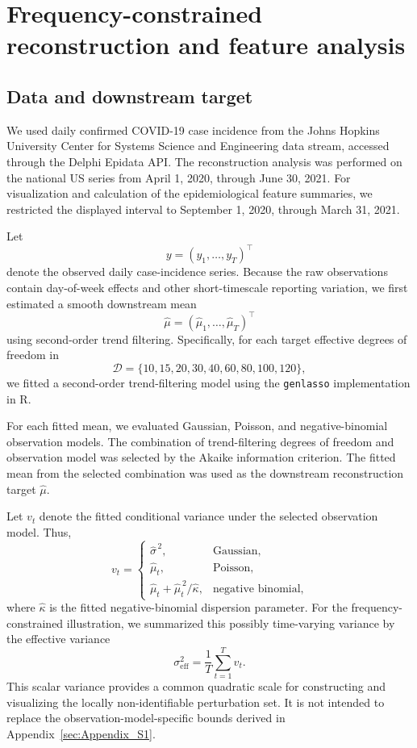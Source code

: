 \renewcommand{\thesection}{S\arabic{section}}
\setcounter{section}{2}

\section{Frequency-constrained reconstruction and feature analysis}
\label{sec:Appendix_S3}

\subsection{Data and downstream target}
\label{sec:appendix_downstream_target}

We used daily confirmed COVID-19 case incidence from the Johns Hopkins
University Center for Systems Science and Engineering data stream, accessed
through the Delphi Epidata API. The reconstruction analysis was performed on
the national US series from April 1, 2020, through June 30, 2021. For
visualization and calculation of the epidemiological feature summaries, we
restricted the displayed interval to September 1, 2020, through March 31,
2021.

Let
\[
y=(y_1,\ldots,y_T)^\top
\]
denote the observed daily case-incidence series. Because the raw observations
contain day-of-week effects and other short-timescale reporting variation, we
first estimated a smooth downstream mean
\[
\widehat{\mu}
=
(\widehat{\mu}_1,\ldots,\widehat{\mu}_T)^\top
\]
using second-order trend filtering. Specifically, for each target effective
degrees of freedom in
\[
\mathcal D
=
\{10,15,20,30,40,60,80,100,120\},
\]
we fitted a second-order trend-filtering model using the \texttt{genlasso}
implementation in R.

For each fitted mean, we evaluated Gaussian, Poisson, and
negative-binomial observation models. The combination of trend-filtering
degrees of freedom and observation model was selected by the Akaike
information criterion. The fitted mean from the selected combination was used
as the downstream reconstruction target \(\widehat{\mu}\).

Let \(v_t\) denote the fitted conditional variance under the selected
observation model. Thus,
\[
v_t=
\begin{cases}
\widehat{\sigma}^{\,2},
&\text{Gaussian},\\[4pt]
\widehat{\mu}_t,
&\text{Poisson},\\[4pt]
\widehat{\mu}_t+\widehat{\mu}_t^{\,2}/\widehat{\kappa},
&\text{negative binomial},
\end{cases}
\]
where \(\widehat{\kappa}\) is the fitted negative-binomial dispersion
parameter. For the frequency-constrained illustration, we summarized this
possibly time-varying variance by the effective variance
\[
\sigma_{\mathrm{eff}}^2
=
\frac{1}{T}\sum_{t=1}^{T}v_t.
\]
This scalar variance provides a common quadratic scale for constructing and
visualizing the locally non-identifiable perturbation set. It is not intended
to replace the observation-model-specific bounds derived in
Appendix~\ref{sec:Appendix_S1}.


